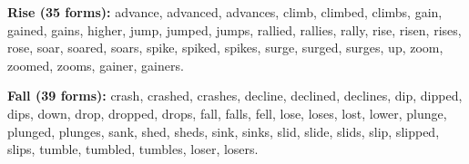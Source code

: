 \textbf{Rise (35 forms):} advance, advanced, advances, climb, climbed, climbs, gain, gained, gains, higher, jump, jumped, jumps, rallied, rallies, rally, rise, risen, rises, rose, soar, soared, soars, spike, spiked, spikes, surge, surged, surges, up, zoom, zoomed, zooms, gainer, gainers.

\textbf{Fall (39 forms):} crash, crashed, crashes, decline, declined, declines, dip, dipped, dips, down, drop, dropped, drops, fall, falls, fell, lose, loses, lost, lower, plunge, plunged, plunges, sank, shed, sheds, sink, sinks, slid, slide, slids, slip, slipped, slips, tumble, tumbled, tumbles, loser, losers.

